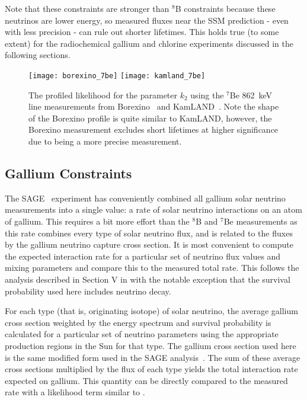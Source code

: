 Note that these constraints are stronger than $^8$B constraints because these neutrinos are lower energy, so measured fluxes near the SSM prediction - even with less precision - can rule out shorter lifetimes.
This holds true (to some extent) for the radiochemical gallium and chlorine experiments discussed in the following sections.

\begin{figure}
\centering
\texttt{[image: borexino\_7be]}
\texttt{[image: kamland\_7be]}
\caption{The profiled likelihood for the parameter $k_2$ using the $^7$Be 862~keV line measurements from Borexino~\cite{borexino7be} and KamLAND~\cite{kamland7be}. Note the shape of the Borexino profile is quite similar to KamLAND, however, the Borexino measurement excludes short lifetimes at higher significance due to being a more precise measurement.}
\label{fig:7be_profiles}
\end{figure}

\subsection{Gallium Constraints}

The SAGE~\cite{sagecombo} experiment has conveniently combined all gallium solar neutrino measurements into a single value: a rate of solar neutrino interactions on an atom of gallium. 
This requires a bit more effort than the $^8$B and $^7$Be measurements as this rate combines every type of solar neutrino flux, and is related to the fluxes by the gallium neutrino capture cross section.
It is most convenient to compute the expected interaction rate for a particular set of neutrino flux values and mixing parameters and compare this to the measured total rate. 
This follows the analysis described in Section V in \cite{sagecombo} with the notable exception that the survival probability used here includes neutrino decay.

For each type (that is, originating isotope) of solar neutrino, the average gallium cross section weighted by the energy spectrum and survival probability is calculated for a particular set of neutrino parameters using the appropriate production regions in the Sun for that type.
The gallium cross section used here is the same modified form used in the SAGE analysis~\cite{sagecombo}.
The sum of these average cross sections multiplied by the flux of each type yields the total interaction rate expected on gallium.
This quantity can be directly compared to the measured rate with a likelihood term similar to .

